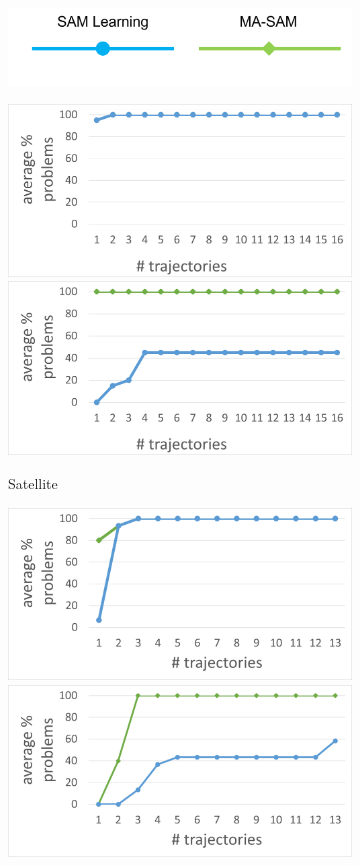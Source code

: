 \documentclass[letterpaper]{article} %
\theoremstyle{definition}
\theoremstyle{remark}
\begin{document}
\begin{figure}[htbp]
  \centering
    \begin{subfigure}[b]{\columnwidth}
    \centering
    \includegraphics[width=0.8\columnwidth]{figures/legend-graphs.png}
    \label{fig:legend}
  \end{subfigure}
  \begin{subfigure}[b]{\columnwidth}
    \centering
    \includegraphics[width=0.48\columnwidth]{figures/sat_easy_learning.png}
    \includegraphics[width=0.48\columnwidth]{figures/sat_hard_learning.png}
    \caption{Satellite}
    \label{fig:sat-results}
  \end{subfigure}
  \begin{subfigure}[b]{\columnwidth}
    \centering
    \includegraphics[width=0.48\columnwidth]{figures/driverlog_easy_learning.png}
    \includegraphics[width=0.48\columnwidth]{figures/driverlog_hard_learning.png}

\end{subfigure}
\end{figure}
\end{document}
